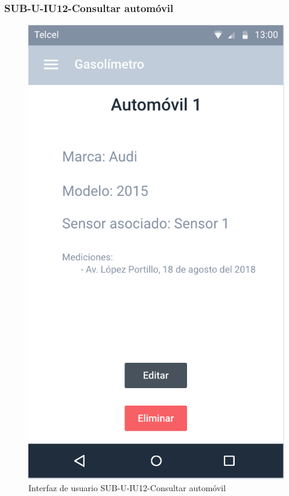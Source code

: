 \subsubsection{SUB-U-IU12-Consultar automóvil}\label{SUB-U-IU12}
\begin{figure}[H]
	\centering
	\includegraphics[scale=1]{Capitulo4/software/submodulos/usuarios/images/sub-u-iu12}
	\caption{Interfaz de usuario SUB-U-IU12-Consultar automóvil}
	\label{fig:sub-u-iu12}
\end{figure}